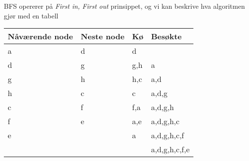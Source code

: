 \documentclass{article}
\begin{document}
\begin{ans}
    BFS opererer på \textit{First in, First out} prinsippet, og vi kan beskrive hva algoritmen gjør med en tabell
        \begin{table}[H]
            \begin{center}
                \begin{tabular}[c]{|l|l|l|l|}
                    \hline
                    Nåværende node& Neste node & Kø & Besøkte  \\
                    \hline
                      a&d&d&\\
                    \hline
                      d&g&g,h&a\\
                    \hline
                      g&h&h,c&a,d\\
                    \hline
                      h&c&c&a,d,g\\
                    \hline
                      c&f&f,a&a,d,g,h\\
                    \hline
                      f&e&a,e&a,d,g,h,c\\
                    \hline
                      e&&a&a,d,g,h,c,f\\
                    \hline
                      &&&a,d,g,h,c,f,e\\
                    \hline
                \end{tabular}
            \end{center}
        \end{table}
\end{ans}
\end{document}

